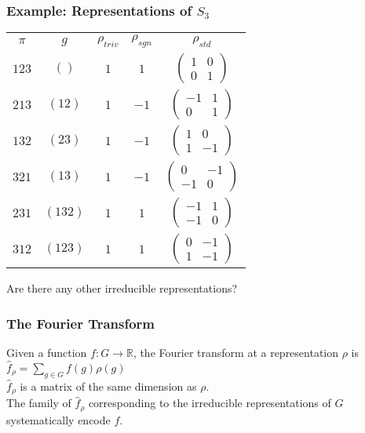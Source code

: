 \documentclass{beamer} %
\theoremstyle{definition} %
\def \pausenl {\pause $ \ $\\}
\begin{document}
\begin{frame}
	\frametitle{Example: Representations of $S_3$}
	
		\begin{center}
			\begin{tabular}{c<{\onslide<3->}c<{\onslide<4->}c<{\onslide<5->}c<{\onslide<6->}c<{\onslide<2->}}
				$\pi$ & $g$ &           $\rho_{triv}$ 	& $\rho_{sgn}$ 		& $\rho_{std}$ 			\\
				$123$   & $()$   & $1$ 			& $1$      			& $\begin{pmatrix} 1 & 0  \\ 0 & 1 \end{pmatrix} $ \\
				$213$   & $(12)$   	& $1$ 			& $-1$      		& $\begin{pmatrix} -1 & 1  \\ 0 & 1 \end{pmatrix} $     		\\
				$132$   & $(23)$   	& $1$ 			& $-1$      		& $\begin{pmatrix} 1 & 0  \\ 1 & -1 \end{pmatrix} $    												\\
				$321$   & $(13)$   		& $1$ 			& $-1$      		& $\begin{pmatrix} 0 & -1  \\ -1 & 0 \end{pmatrix} $     \\			
				$231$   & $(132)$   	& $1$ 			& $1$      			&$\begin{pmatrix} -1 & 1  \\ -1 & 0 \end{pmatrix} $     		\\
				$312$   & $(123)$   	& $1$ 			& $1$      			& $\begin{pmatrix} 0 & -1  \\ 1 & -1 \end{pmatrix} $     		
				
			\end{tabular}
			
		\end{center}	
		
		\pause[8]
		
		Are there any other irreducible representations?
		

\end{frame}

\begin{frame}
	\frametitle{The Fourier Transform}
	
	Given a function $f:G\rightarrow \mathbb{R}$, the Fourier transform at a representation $\rho$ is\\
	\pause
	$\hat{f}_\rho = \sum\limits_{g\in G} f(g)\rho(g)$\\
	
	\pausenl
	
	$\hat{f}_\rho$ is a matrix of the same dimension as $\rho$.\\\pausenl
	
	The family of $\hat{f}_\rho$ corresponding to the irreducible representations of $G$ systematically encode $f$.
\end{frame}
\end{document}
